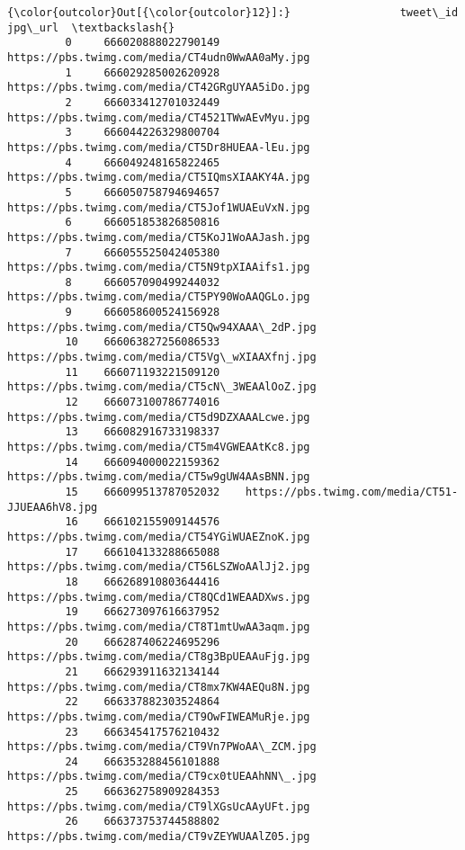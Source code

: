 \documentclass[11pt]{article}
\begin{document}
\begin{Verbatim}[commandchars=\\\{\}]
{\color{outcolor}Out[{\color{outcolor}12}]:}                 tweet\_id                                            jpg\_url  \textbackslash{}
         0     666020888022790149    https://pbs.twimg.com/media/CT4udn0WwAA0aMy.jpg   
         1     666029285002620928    https://pbs.twimg.com/media/CT42GRgUYAA5iDo.jpg   
         2     666033412701032449    https://pbs.twimg.com/media/CT4521TWwAEvMyu.jpg   
         3     666044226329800704    https://pbs.twimg.com/media/CT5Dr8HUEAA-lEu.jpg   
         4     666049248165822465    https://pbs.twimg.com/media/CT5IQmsXIAAKY4A.jpg   
         5     666050758794694657    https://pbs.twimg.com/media/CT5Jof1WUAEuVxN.jpg   
         6     666051853826850816    https://pbs.twimg.com/media/CT5KoJ1WoAAJash.jpg   
         7     666055525042405380    https://pbs.twimg.com/media/CT5N9tpXIAAifs1.jpg   
         8     666057090499244032    https://pbs.twimg.com/media/CT5PY90WoAAQGLo.jpg   
         9     666058600524156928    https://pbs.twimg.com/media/CT5Qw94XAAA\_2dP.jpg   
         10    666063827256086533    https://pbs.twimg.com/media/CT5Vg\_wXIAAXfnj.jpg   
         11    666071193221509120    https://pbs.twimg.com/media/CT5cN\_3WEAAlOoZ.jpg   
         12    666073100786774016    https://pbs.twimg.com/media/CT5d9DZXAAALcwe.jpg   
         13    666082916733198337    https://pbs.twimg.com/media/CT5m4VGWEAAtKc8.jpg   
         14    666094000022159362    https://pbs.twimg.com/media/CT5w9gUW4AAsBNN.jpg   
         15    666099513787052032    https://pbs.twimg.com/media/CT51-JJUEAA6hV8.jpg   
         16    666102155909144576    https://pbs.twimg.com/media/CT54YGiWUAEZnoK.jpg   
         17    666104133288665088    https://pbs.twimg.com/media/CT56LSZWoAAlJj2.jpg   
         18    666268910803644416    https://pbs.twimg.com/media/CT8QCd1WEAADXws.jpg   
         19    666273097616637952    https://pbs.twimg.com/media/CT8T1mtUwAA3aqm.jpg   
         20    666287406224695296    https://pbs.twimg.com/media/CT8g3BpUEAAuFjg.jpg   
         21    666293911632134144    https://pbs.twimg.com/media/CT8mx7KW4AEQu8N.jpg   
         22    666337882303524864    https://pbs.twimg.com/media/CT9OwFIWEAMuRje.jpg   
         23    666345417576210432    https://pbs.twimg.com/media/CT9Vn7PWoAA\_ZCM.jpg   
         24    666353288456101888    https://pbs.twimg.com/media/CT9cx0tUEAAhNN\_.jpg   
         25    666362758909284353    https://pbs.twimg.com/media/CT9lXGsUcAAyUFt.jpg   
         26    666373753744588802    https://pbs.twimg.com/media/CT9vZEYWUAAlZ05.jpg   

\end{Verbatim}
\end{document}
